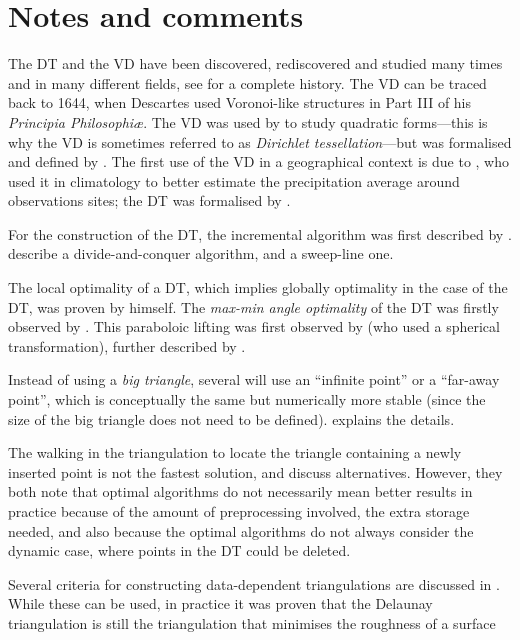 %
\section{Notes and comments}
\label{sec:notes}

The DT and the VD have been discovered, rediscovered and studied many times and in many different fields, see \citet{Okabe00} for a complete history.
The VD can be traced back to 1644, when Descartes used Voronoi-like structures in Part III of his \emph{Principia Philosophi\ae}. 
The VD was used by \citet{Dirichlet50} to study quadratic forms---this is why the VD is sometimes referred to as \emph{Dirichlet tessellation}---but was formalised and defined by \citet{Voronoi08}. 
The first use of the VD in a geographical context is due to \citet{Thiessen11}, who used it in climatology to better estimate the precipitation average around observations sites; the DT was formalised by \citet{Delaunay34}. 

For the construction of the DT, the incremental algorithm was first described by \citet{Lawson72-1}.
\citet{Guibas85} describe a divide-and-conquer algorithm, and \citet{Fortune87} a sweep-line one.

The local optimality of a DT, which implies globally optimality in the case of the DT, was proven by \citet{Delaunay34} himself.
The \emph{max-min angle optimality} of the DT was firstly observed by \citet{Sibson78}.
This paraboloic lifting was first observed by \citet{Brown79} (who used a spherical transformation), further described by \citet{Seidel82,Edelsbrunner86}. 

Instead of using a \emph{big triangle}, several will use an ``infinite point'' or a ``far-away point'', which is conceptually the same but numerically more stable (since the size of the big triangle does not need to be defined).
\citet{Liu05-1} explains the details.

The walking in the triangulation to locate the triangle containing a newly inserted point is not the fastest solution, \citet{Mucke99} and \citet{Devillers02} discuss alternatives.
However, they both note that optimal algorithms do not necessarily mean better results in practice because of the amount of preprocessing involved, the extra storage needed, and also because the optimal algorithms do not always consider the dynamic case, where points in the DT could be deleted. 

Several criteria for constructing data-dependent triangulations are discussed in \citet{Dyn90}. 
While these can be used, in practice it was proven that the Delaunay triangulation is still the triangulation that minimises the roughness of a surface~\citep{Wang01,Rippa90}

